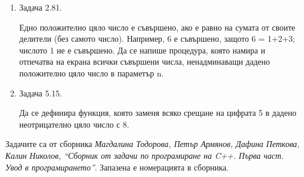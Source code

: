 \documentclass[12pt,a4paper]{article}
\begin{document}
\begin{enumerate}
\item Задача 2.81. 

Едно положително цяло число е съвършено, ако е равно на сумата от своите делители (без самото число). Например, 6 е съвършено, защото 6 = 1+2+3; числото 1 не е съвършено. Да се напише процедура, която намира и отпечатва на екрана  всички съвършени числа, ненадминаващи дадено положително цяло число в параметър n.

\item Задача 5.15. 

Да се дефинира функция, която заменя всяко срещане на цифрата 5 в дадено неотрицателно цяло число с 8.




\end{enumerate}


	\vspace{20px}

	\small{Задачите са от сборника \textit{Магдалина Тодорова, Петър Армянов, Дафина Петкова, Калин Николов, ``Сборник от задачи по програмиране на C++. Първа част. Увод в програмирането''}. Запазена е номерацията в сборника.}
\end{document}
